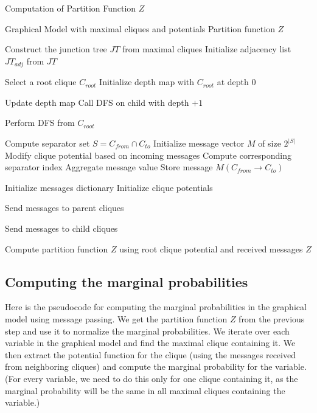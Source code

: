\documentclass[a4paper,12pt]{article}
\begin{document}
\begin{algorithm}
    \caption{Computation of Partition Function \( Z \)}
    \begin{algorithmic}[1]
    \Require Graphical Model with maximal cliques and potentials
    \Ensure Partition function \( Z \)
    
    \State Construct the junction tree \( JT \) from maximal cliques
    \State Initialize adjacency list \( JT_{adj} \) from \( JT \)
    
    \State Select a root clique \( C_{root} \)
    \State Initialize depth map with \( C_{root} \) at depth 0
    
                \State Update depth map
                \State Call DFS on child with depth $+1$
            \EndIf
        \EndFor
    \EndFunction
    
    \State Perform DFS from \( C_{root} \)
    
        \State Compute separator set \( S = C_{from} \cap C_{to} \)
        \State Initialize message vector \( M \) of size \( 2^{|S|} \)
        \State Modify clique potential based on incoming messages
            \State Compute corresponding separator index
            \State Aggregate message value
        \EndFor
        \State Store message \( M(C_{from} \to C_{to}) \)
    \EndFunction
    
    \State Initialize messages dictionary
    \State Initialize clique potentials
    
        \State Send messages to parent cliques
    \EndFor
    
        \State Send messages to child cliques
    \EndFor
    
    \State Compute partition function \( Z \) using root clique potential and received messages
    \State \Return \( Z \)
    
    \end{algorithmic}
\end{algorithm}

\subsection*{Computing the marginal probabilities}
Here is the pseudocode for computing the marginal probabilities in the graphical model using message passing. We get the partition function \( Z \) from the previous step and use it to normalize the marginal probabilities. We iterate over each variable in the graphical model and find the maximal clique containing it. We then extract the potential function for the clique (using the messages received from neighboring cliques) and compute the marginal probability for the variable. (For every variable, we need to do this only for one clique containing it, as the marginal probability will be the same in all maximal cliques containing the variable.)
\end{document}
